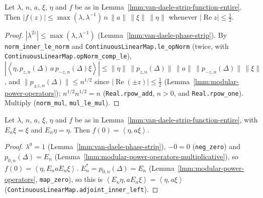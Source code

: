 \begin{lemma}
    \label{lmm:van-daele-strip-function-bounded}
    \leanok
    Let $\lambda$, $n$, $a$, $\xi$, $\eta$ and $f$ be as in Lemma~\ref{lmm:van-daele-strip-function-entire}. Then $|f(z)| \le \max(\lambda, \lambda^{-1})\, n\,\|a\|\,\|\xi\|\,\|\eta\|$ whenever $|\operatorname{Re} z| \le \tfrac{1}{2}$.
\end{lemma}
\begin{proof}
    \leanok
    $|\lambda^{2z}| \le \max(\lambda, \lambda^{-1})$ (Lemma~\ref{lmm:van-daele-phase-strip}). By \texttt{norm\_inner\_le\_norm} and \texttt{ContinuousLinearMap.le\_opNorm} (twice, with \texttt{ContinuousLinearMap.opNorm\_comp\_le}), $|\left< \eta, p_{z,n}(\Delta)\,a\,p_{-z,n}(\Delta)\xi \right>| \le \|\eta\|\,\|p_{z,n}(\Delta)\|\,\|a\|\,\|p_{-z,n}(\Delta)\|\,\|\xi\|$, and $\|p_{\pm z,n}(\Delta)\| \le n^{1/2}$ since $|\operatorname{Re}(\pm z)| \le \tfrac{1}{2}$ (Lemma~\ref{lmm:modular-power-operators}); $n^{1/2}n^{1/2} = n$ (\texttt{Real.rpow\_add}, $n > 0$, and \texttt{Real.rpow\_one}). Multiply (\texttt{norm\_mul}, \texttt{mul\_le\_mul}).
\end{proof}

\begin{lemma}
    \label{lmm:van-daele-strip-function-zero}
    \leanok
    Let $\lambda$, $n$, $a$, $\xi$, $\eta$ and $f$ be as in Lemma~\ref{lmm:van-daele-strip-function-entire}, with $E_n\xi = \xi$ and $E_n\eta = \eta$. Then $f(0) = \left< \eta, a\xi \right>$.
\end{lemma}
\begin{proof}
    \leanok
    $\lambda^0 = 1$ (Lemma~\ref{lmm:van-daele-phase-strip}), $-0 = 0$ (\texttt{neg\_zero}) and $p_{0,n}(\Delta) = E_n$ (Lemma~\ref{lmm:modular-power-operators-multiplicative}), so $f(0) = \left< \eta, E_n a E_n\xi \right>$. $E_n^* = p_{\overline{0},n}(\Delta) = E_n$ (Lemma~\ref{lmm:modular-power-operators}, \texttt{map\_zero}), so this is $\left< E_n\eta, aE_n\xi \right> = \left< \eta, a\xi \right>$ (\texttt{ContinuousLinearMap.adjoint\_inner\_left}).
\end{proof}

